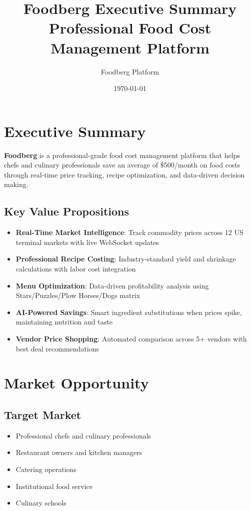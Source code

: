 \documentclass[11pt,a4paper]{article}
\title{Foodberg Executive Summary\\
\large Professional Food Cost Management Platform}
\author{Foodberg Platform}
\date{\today}
\begin{document}
\maketitle

\section*{Executive Summary}

\textbf{Foodberg} is a professional-grade food cost management platform that helps chefs and culinary professionals save an average of \$500/month on food costs through real-time price tracking, recipe optimization, and data-driven decision making.

\subsection*{Key Value Propositions}

\begin{itemize}
    \item \textbf{Real-Time Market Intelligence}: Track commodity prices across 12 US terminal markets with live WebSocket updates
    \item \textbf{Professional Recipe Costing}: Industry-standard yield and shrinkage calculations with labor cost integration
    \item \textbf{Menu Optimization}: Data-driven profitability analysis using Stars/Puzzles/Plow Horses/Dogs matrix
    \item \textbf{AI-Powered Savings}: Smart ingredient substitutions when prices spike, maintaining nutrition and taste
    \item \textbf{Vendor Price Shopping}: Automated comparison across 5+ vendors with best deal recommendations
\end{itemize}

\section{Market Opportunity}

\subsection{Target Market}
\begin{itemize}
    \item Professional chefs and culinary professionals
    \item Restaurant owners and kitchen managers
    \item Catering operations
    \item Institutional food service
    \item Culinary schools
\end{itemize}
\end{document}
